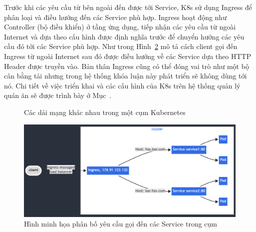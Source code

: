 Trước khi các yêu cầu từ bên ngoài đến được tới Service, K8s sử dụng Ingress để phân loại và điều hướng đến các Service phù hợp.
Ingress hoạt động như Controller (bộ điều khiển) ở tầng ứng dụng, tiếp nhận các yêu cầu từ ngoài Internet và dựa theo cấu hình được định nghĩa trước để chuyển hướng các yêu cầu đó tới các Service phù hợp.
Như trong Hình~\ref{fig:k8s-ingress} mô tả cách client gọi đến Ingress từ ngoài Internet sau đó được điều hướng về các Service dựa theo HTTP Header  được truyền vào.
Bản thân Ingress cũng có thể đóng vai trò như một bộ cân bằng tải nhưng trong hệ thống khóa luận này phát triển sẽ không dùng tới nó.
Chi tiết về việc triển khai và các cấu hình của K8s trên hệ thống quản lý quán ăn sẽ được trình bày ở Mục~.
\begin{figure}[H]
	\centering
	
	\caption{Các dải mạng khác nhau trong một cụm Kubernetes~\protect\footnotemark}
	\label{fig:k8s-cluster-network}
\end{figure}
\begin{figure}[H]
	\centering
	\includegraphics[width=\textwidth]{images/hChip/K8s/ingress-flow.png}
	\caption{Hình minh họa phân bố yêu cầu gọi đến các Service trong cụm ~\protect\footnotemark}
	\label{fig:k8s-ingress}
\end{figure}
\newpage
